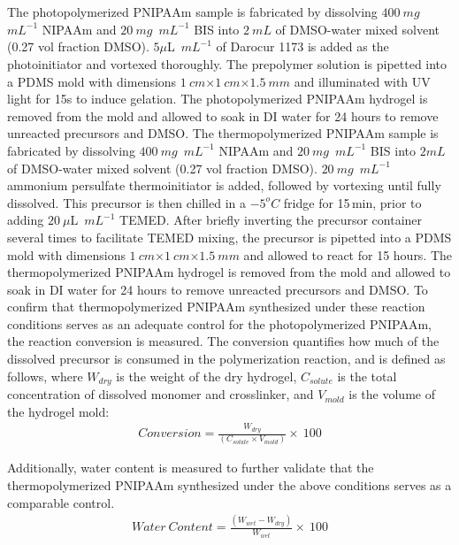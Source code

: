 \section{}
\label{sec:photoThermo}
The photopolymerized PNIPAAm sample is fabricated by dissolving $400~mg$~$mL^{-1}$ NIPAAm and $20~mg$~$mL^{-1}$ BIS into $2~mL$ of DMSO-water mixed solvent (0.27 vol fraction DMSO). $5\mu$L~$mL^{-1}$ of Darocur 1173 is added as the photoinitiator and vortexed thoroughly. The prepolymer solution is pipetted into a PDMS mold with dimensions $1~cm$$\times$$1~cm$$\times$$1.5~mm$ and illuminated with UV light for 15s to induce gelation. The photopolymerized PNIPAAm hydrogel is removed from the mold and allowed to soak in DI water for 24 hours to remove unreacted precursors and DMSO. The thermopolymerized PNIPAAm sample is fabricated by dissolving $400~mg$~$mL^{-1}$ NIPAAm and $20~mg$~$mL^{-1}$ BIS into $2mL$ of DMSO-water mixed solvent (0.27 vol fraction DMSO). $20~mg$~$mL^{-1}$ ammonium persulfate thermoinitiator is added, followed by vortexing until fully dissolved. This precursor is then chilled in a $-5^{o}C$ fridge for 15\,min, prior to adding $20~\mu$L~$mL^{-1}$ TEMED. After briefly inverting the precursor container several times to facilitate TEMED mixing, the precursor is pipetted into a PDMS mold with dimensions $1~cm$$\times$$1~cm$$\times$$1.5~mm$ and allowed to react for 15 hours. The thermopolymerized PNIPAAm hydrogel is removed from the mold and allowed to soak in DI water for 24 hours to remove unreacted precursors and DMSO.
To confirm that thermopolymerized PNIPAAm synthesized under these reaction conditions serves as an adequate control for the photopolymerized PNIPAAm, the reaction conversion is measured. The conversion quantifies how much of the dissolved precursor is consumed in the polymerization reaction, and is defined as follows, where $W_{dry}$  is the weight of the dry hydrogel, $C_{solute}$ is the total concentration of dissolved monomer and crosslinker, and $V_{mold}$  is the volume of the hydrogel mold:
\begin{align}
	Conversion = \frac{W_{dry}}{(C_{solute}×V_{mold} )}\times~100
\end{align}

Additionally, water content is measured to further validate that the thermopolymerized PNIPAAm synthesized under the above conditions serves as a comparable control. 
\begin{align}
	Water~Content = \frac{(W_{wet}-W_{dry})}{W_{wet}}\times~100
\end{align}

